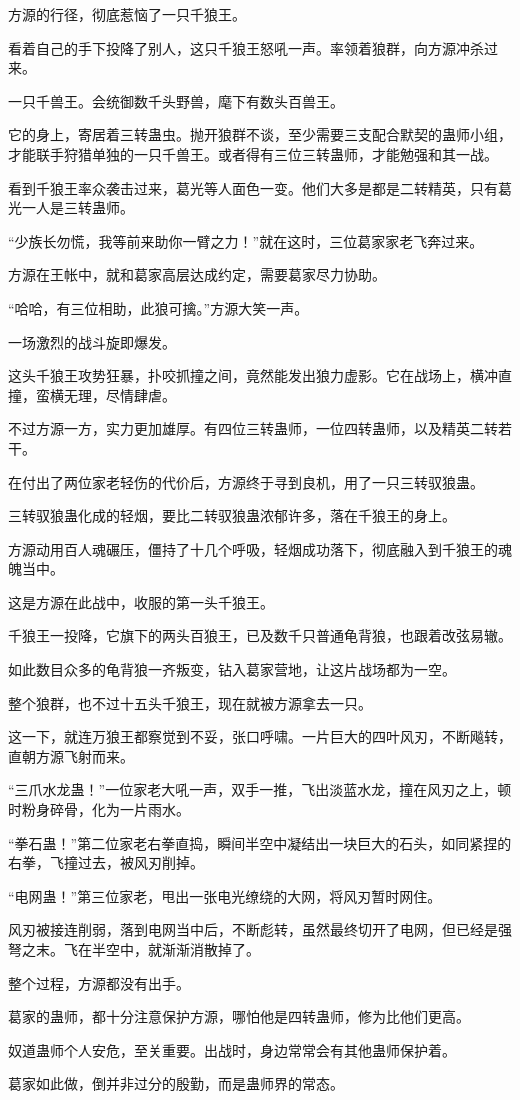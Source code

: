 \begin{this_body}
方源的行径，彻底惹恼了一只千狼王。

看着自己的手下投降了别人，这只千狼王怒吼一声。率领着狼群，向方源冲杀过来。

一只千兽王。会统御数千头野兽，麾下有数头百兽王。

它的身上，寄居着三转蛊虫。抛开狼群不谈，至少需要三支配合默契的蛊师小组，才能联手狩猎单独的一只千兽王。或者得有三位三转蛊师，才能勉强和其一战。

看到千狼王率众袭击过来，葛光等人面色一变。他们大多是都是二转精英，只有葛光一人是三转蛊师。

“少族长勿慌，我等前来助你一臂之力！”就在这时，三位葛家家老飞奔过来。

方源在王帐中，就和葛家高层达成约定，需要葛家尽力协助。

“哈哈，有三位相助，此狼可擒。”方源大笑一声。

一场激烈的战斗旋即爆发。

这头千狼王攻势狂暴，扑咬抓撞之间，竟然能发出狼力虚影。它在战场上，横冲直撞，蛮横无理，尽情肆虐。

不过方源一方，实力更加雄厚。有四位三转蛊师，一位四转蛊师，以及精英二转若干。

在付出了两位家老轻伤的代价后，方源终于寻到良机，用了一只三转驭狼蛊。

三转驭狼蛊化成的轻烟，要比二转驭狼蛊浓郁许多，落在千狼王的身上。

方源动用百人魂碾压，僵持了十几个呼吸，轻烟成功落下，彻底融入到千狼王的魂魄当中。

这是方源在此战中，收服的第一头千狼王。

千狼王一投降，它旗下的两头百狼王，已及数千只普通龟背狼，也跟着改弦易辙。

如此数目众多的龟背狼一齐叛变，钻入葛家营地，让这片战场都为一空。

整个狼群，也不过十五头千狼王，现在就被方源拿去一只。

这一下，就连万狼王都察觉到不妥，张口呼啸。一片巨大的四叶风刃，不断飚转，直朝方源飞射而来。

“三爪水龙蛊！”一位家老大吼一声，双手一推，飞出淡蓝水龙，撞在风刃之上，顿时粉身碎骨，化为一片雨水。

“拳石蛊！”第二位家老右拳直捣，瞬间半空中凝结出一块巨大的石头，如同紧捏的右拳，飞撞过去，被风刃削掉。

“电网蛊！”第三位家老，甩出一张电光缭绕的大网，将风刃暂时网住。

风刃被接连削弱，落到电网当中后，不断彪转，虽然最终切开了电网，但已经是强弩之末。飞在半空中，就渐渐消散掉了。

整个过程，方源都没有出手。

葛家的蛊师，都十分注意保护方源，哪怕他是四转蛊师，修为比他们更高。

奴道蛊师个人安危，至关重要。出战时，身边常常会有其他蛊师保护着。

葛家如此做，倒并非过分的殷勤，而是蛊师界的常态。

\end{this_body}

